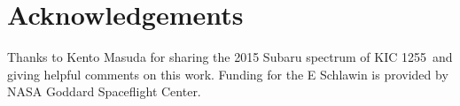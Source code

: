 \documentclass[preprint]{aastex61}
\newcommand{\shStar}{KIC 1255}
\begin{document}
\section{Acknowledgements}
Thanks to Kento Masuda for sharing the 2015 Subaru spectrum of \shStar\ and giving helpful comments on this work.
Funding for the E Schlawin is provided by NASA Goddard Spaceflight Center.






\end{document}
